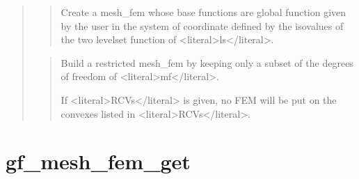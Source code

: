 \documentclass[a4paper,11pt,english]{sphinxmanual}
\begin{document}
\begin{quote}
\sphinxAtStartPar
{}
\begin{quote}

\sphinxAtStartPar
Create a mesh\_fem whose base functions are global function given by the
user in the system of coordinate defined by the iso\sphinxhyphen{}values of the two
level\sphinxhyphen{}set function of \textless{}literal\textgreater{}ls\textless{}/literal\textgreater{}.
\end{quote}

\sphinxAtStartPar
{}
\begin{quote}

\sphinxAtStartPar
Build a restricted mesh\_fem by keeping only a subset of the degrees of
freedom of \textless{}literal\textgreater{}mf\textless{}/literal\textgreater{}.

\sphinxAtStartPar
If \textless{}literal\textgreater{}RCVs\textless{}/literal\textgreater{} is given, no FEM will be put on the convexes listed in
\textless{}literal\textgreater{}RCVs\textless{}/literal\textgreater{}.
\end{quote}
\end{quote}


\section{gf\_mesh\_fem\_get}
\label{\detokenize{scilab/cmdref_gf_mesh_fem_get:gf-mesh-fem-get}}\label{\detokenize{scilab/cmdref_gf_mesh_fem_get::doc}}
\sphinxAtStartPar
{}
\end{document}
